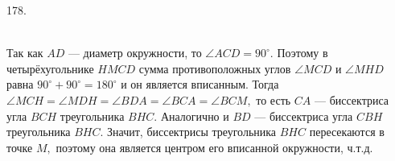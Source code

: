 178. \begin{figure}[ht!]
\end{figure}\\
Так как $AD$ --- диаметр окружности, то $ \angle ACD = 90^\circ.$ Поэтому в четырёхугольнике $HMCD$ сумма противоположных углов $\angle MCD$ и $\angle MHD$ равна $90^\circ+90^\circ=180^\circ$ и он является вписанным. Тогда $\angle MCH = \angle MDH = \angle BDA =  \angle BCA =  \angle BCM,$
то есть $CA$ --- биссектриса угла $BCH$ треугольника $BHC.$
Аналогично и $BD$ --- биссектриса угла $CBH$ треугольника $BHC.$ Значит, биссектрисы треугольника $BHC$ пересекаются в точке $M,$ поэтому она является центром его вписанной окружности, ч.т.д.\\
